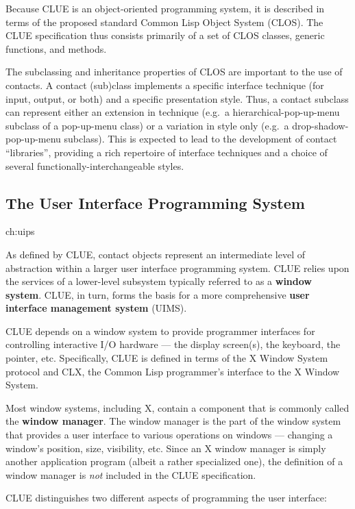 Because CLUE is an object-oriented programming system, it is described
in terms of the proposed standard
Common Lisp Object System (CLOS)\cite{clos}. The CLUE
specification thus
consists primarily of a set of CLOS classes, generic functions, and methods. 


The subclassing and inheritance properties of CLOS are
important to the use of contacts. A contact (sub)class implements a
specific interface technique (for input, output, or both) and a specific
presentation style. Thus, a contact subclass
can represent either an extension in technique (e.g.\ a hierarchical-pop-up-menu
subclass of a pop-up-menu class) or a variation in style only (e.g.\ a
drop-shadow-pop-up-menu subclass). This is expected to lead to the development
of contact ``libraries'', providing a rich repertoire of interface
techniques and a choice of several functionally-interchangeable styles.

\subsection{The User Interface Programming System}{ch:uips}

As defined by CLUE, contact objects represent an intermediate level of
abstraction within a larger user interface programming system.
CLUE relies upon the services of a lower-level subsystem typically referred to as
a {\bf window system}. CLUE, in turn, forms the basis for a
more comprehensive {\bf user interface management system}
(UIMS).

CLUE depends on a window system to provide programmer interfaces for controlling
interactive I/O hardware  --- the display screen(s), the keyboard, the
pointer, etc.  Specifically, CLUE is defined in
terms of the X Window System protocol\cite{x-protocol} and CLX, the
Common Lisp programmer's interface to the X Window System\cite{clx}. 

Most window systems, including X, contain a component that is commonly called the 
{\bf window manager}. The window manager is the
part of the window system that provides a user interface to various operations on
windows --- changing a window's position, size, visibility, etc.
Since an X window manager is simply another application program (albeit a rather
specialized one), the
definition of a window manager is {\em not} included in the CLUE specification.

CLUE distinguishes two different aspects of programming the user
interface:

